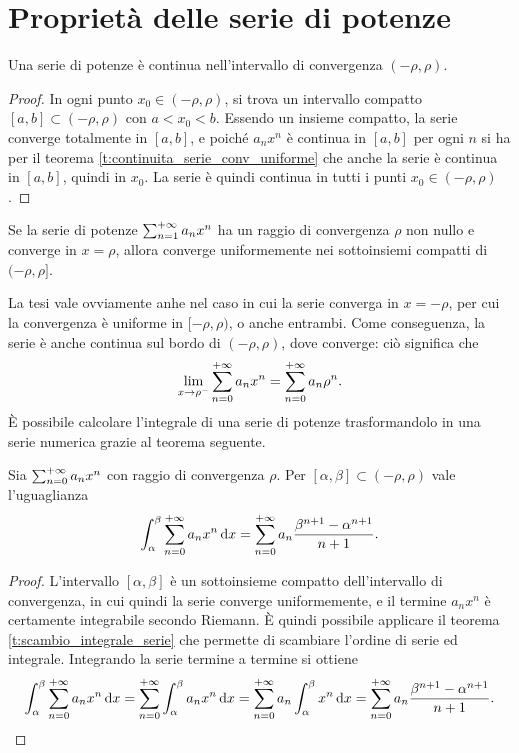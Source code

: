 \section{Proprietà delle serie di potenze}
\begin{teorema}
Una serie di potenze è continua nell'intervallo di convergenza $(-\rho,\rho)$.
\end{teorema}
\begin{proof}
In ogni punto $x_0\in(-\rho,\rho)$, si trova un intervallo compatto $[a,b]\subset(-\rho,\rho)$ con $a<x_0<b$. Essendo un insieme compatto, la serie converge totalmente in $[a,b]$, e poiché $a_nx^n$ è continua in $[a,b]$ per ogni $n$ si ha per il teorema \ref{t:continuita_serie_conv_uniforme} che anche la serie è continua in $[a,b]$, quindi in $x_0$.
La serie è quindi continua in tutti i punti $x_0\in(-\rho,\rho)$. 
\end{proof}
\begin{teorema}[di Abel]
Se la serie di potenze $\sum_{{n}=1}^{+\infty}a_nx^n$ ha un raggio di convergenza $\rho$ non nullo e converge in $x=\rho$, allora converge uniformemente nei sottoinsiemi compatti di $(-\rho,\rho]$.
\end{teorema}
La tesi vale ovviamente anhe nel caso in cui la serie converga in $x=-\rho$, per cui la convergenza è uniforme in $[-\rho,\rho)$, o anche entrambi.
Come conseguenza, la serie è anche continua sul bordo di $(-\rho,\rho)$, dove converge: ciò significa che
\[
\lim_{x\to\rho^-}\sum_{{n}=0}^{+\infty}a_nx^n=\sum_{{n}=0}^{+\infty}a_n\rho^n.
\]
È possibile calcolare l'integrale di una serie di potenze trasformandolo in una serie numerica grazie al teorema seguente.
\begin{teorema} \label{t:integrale-serie-potenze}
	Sia $\sum_{{n}=0}^{+\infty}a_nx^n$ con raggio di convergenza $\rho$.
	Per $[\alpha,\beta]\subset(-\rho,\rho)$ vale l'uguaglianza
	\begin{equation}
		\int_\alpha^\beta\sum_{{n}=0}^{+\infty}a_nx^n\,\textup{d} x=\sum_{{n}=0}^{+\infty}a_n\frac{\beta^{n+1}-\alpha^{n+1}}{n+1}.
	\end{equation}
\end{teorema}
\begin{proof}
	L'intervallo $[\alpha,\beta]$ è un sottoinsieme compatto dell'intervallo di convergenza, in cui quindi la serie converge uniformemente, e il termine $a_nx^n$ è certamente integrabile secondo Riemann.
	È quindi possibile applicare il teorema \ref{t:scambio_integrale_serie} che permette di scambiare l'ordine di serie ed integrale.
	Integrando la serie termine a termine si ottiene
	\begin{equation}
		\int_\alpha^\beta\sum_{{n}=0}^{+\infty}a_nx^n\,\textup{d} x=\sum_{{n}=0}^{+\infty}\int_\alpha^\beta a_nx^n\,\textup{d} x=\sum_{{n}=0}^{+\infty}a_n\int_\alpha^\beta x^n\,\textup{d} x=\sum_{{n}=0}^{+\infty}a_n\frac{\beta^{n+1}-\alpha^{n+1}}{n+1}.
	\end{equation}
\end{proof}

